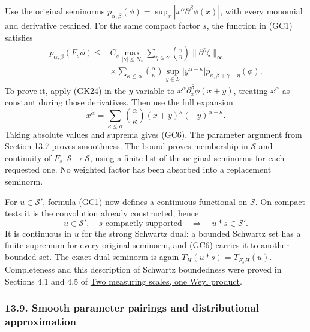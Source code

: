 \documentclass[
  11pt,
]{article}
\begin{document}
Use the original seminorms
\(p_{\alpha,\beta}(\phi)=\sup_x|x^\alpha\partial^\beta\phi(x)|\), with
every monomial and derivative retained. For the same compact factor
\(s\), the function in (GC1) satisfies \[
\begin{aligned}
 p_{\alpha,\beta}(F_s\phi)
 \leq{}&C_s\max_{|\gamma|\leq N_s}
 \sum_{\eta\leq\gamma}\binom{\gamma}{\eta}
          \|\partial^\eta\zeta\|_\infty\\
 &\times\sum_{\kappa\leq\alpha}\binom{\alpha}{\kappa}
    \sup_{y\in L}|y^{\alpha-\kappa}|
             p_{\kappa,\beta+\gamma-\eta}(\phi).
\end{aligned}
 \tag{GC6}
\] To prove it, apply (GK24) in the \(y\)-variable to
\(x^\alpha\partial_x^\beta\phi(x+y)\), treating \(x^\alpha\) as constant
during those derivatives. Then use the full expansion \[
 x^\alpha=\sum_{\kappa\leq\alpha}\binom{\alpha}{\kappa}
       (x+y)^\kappa(-y)^{\alpha-\kappa}.
 \tag{GC7}
\] Taking absolute values and suprema gives (GC6). The parameter
argument from Section 13.7 proves smoothness. The bound proves
membership in \(\mathcal S\) and continuity of
\(F_s:\mathcal S\to\mathcal S\), using a finite list of the original
seminorms for each requested one. No weighted factor has been absorbed
into a replacement seminorm.

For \(u\in\mathcal S'\), formula (GC1) now defines a continuous
functional on \(\mathcal S\). On compact tests it is the convolution
already constructed; hence \[
 u\in\mathcal S',\quad s\text{ compactly supported}
       \quad\Longrightarrow\quad u*s\in\mathcal S'.
 \tag{GC8}
\] It is continuous in \(u\) for the strong Schwartz dual: a bounded
Schwartz set has a finite supremum for every original seminorm, and
(GC6) carries it to another bounded set. The exact dual seminorm is
again \(T_H(u*s)=T_{F_sH}(u)\). Completeness and this description of
Schwartz boundedness were proved in Sections 4.1 and 4.5 of
\href{weyl-metric-products.pdf}{Two measuring scales, one Weyl product}.

\subsubsection{13.9. Smooth parameter pairings and distributional
approximation}\label{smooth-parameter-pairings-and-distributional-approximation}
\end{document}

